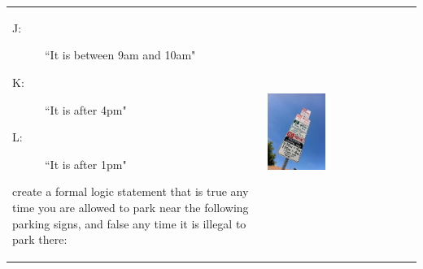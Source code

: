 \documentclass{article}
\begin{document}
\begin{enumerate}
\begin{tabular}{p{}p{}}
\begin{description}
	\item[J:] ``It is between 9am and 10am"
	\item[K:] ``It is after 4pm"
	\item[L:] ``It is after 1pm"
	\end{description}
	create a formal logic statement that is true any time you are allowed to park near the following parking signs, and false any time it is illegal to park there:&
	\begin{center}
	\includegraphics[width=0.4\textwidth,clip,trim=5cm 5cm 5cm 6cm]{parkingSigns.JPG}
	\end{center}
	\end{tabular}
\end{enumerate}
\hrulefill\\
\label{end}
\end{document}
